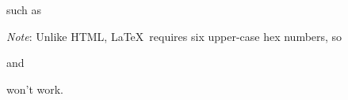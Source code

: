 \begin{code}
 such as
\end{code}

\noindent \emph{Note}: Unlike HTML, \LaTeX\ requires six upper-case hex numbers, so

\begin{code}
\end{code}

\noindent and

\begin{code}
\end{code}

\noindent won't work.



